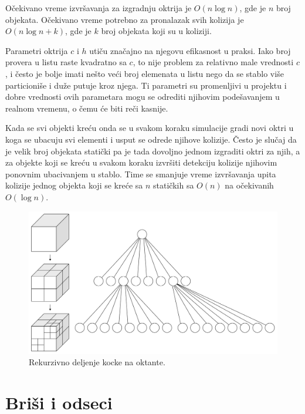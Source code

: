 \documentclass[12pt,oneside]{memoir}
\begin{document}
Očekivano vreme izvršavanja za izgradnju oktrija je $O(n \log n)$, gde je $n$ broj objekata.
Očekivano vreme potrebno za pronalazak svih kolizija je $O(n \log n + k)$, gde je $k$ broj objekata koji su u koliziji.

Parametri oktrija $c$ i $h$  utiču značajno na njegovu efikasnost u praksi. 
Iako broj provera u listu raste kvadratno sa $c$, to nije problem za relativno male vrednosti $c$, i često je bolje 
imati nešto veći broj elemenata u listu nego da se stablo više particioniše i duže putuje kroz njega.
Ti parametri su promenljivi u projektu i dobre vrednosti ovih parametara mogu se odrediti njihovim podešavanjem u realnom vremenu,
o čemu će biti reči kasnije.

Kada se svi objekti kreću onda se u svakom koraku simulacije  gradi novi oktri u
koga se ubacuju svi elementi i usput se odrede njihove kolizije.
Često je slučaj da je velik broj objekata statički pa je tada dovoljno jednom izgraditi oktri za njih, a za objekte koji se kreću u svakom koraku 
izvršiti detekciju kolizije njihovim ponovnim ubacivanjem u stablo. Time se smanjuje vreme izvršavanja upita 
kolizije jednog objekta koji se kreće sa $n$ statičkih sa $O(n)$ na očekivanih $O(\log n)$.

\begin{figure}[h!]
	\begin{center}
	\includegraphics[scale=0.22]{octree.png}
	\end{center}
	\caption{Rekurzivno deljenje kocke na oktante.}
	\label{fig:oct}
\end{figure}

\section{Briši i odseci}
\label{subsec:sap}
\end{document}
